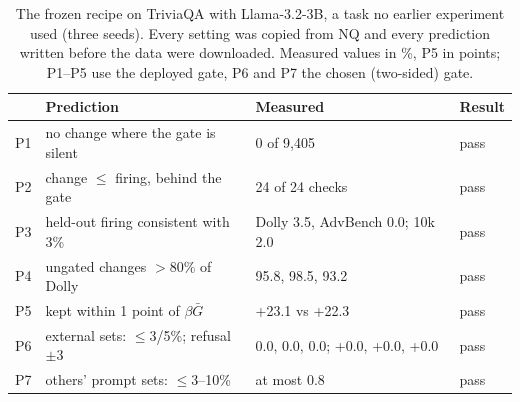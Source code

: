 \begin{table}[t]
\centering
\footnotesize
\setlength{\tabcolsep}{3pt}
\caption{The frozen recipe on TriviaQA with Llama-3.2-3B, a task no earlier experiment used (three seeds). Every
setting was copied from NQ and every prediction written before the data were downloaded. Measured values in \%,
P5 in points; P1--P5 use the deployed gate, P6 and P7 the chosen (two-sided) gate.}
\label{tab:trivia}
\begin{tabular}{l l l l}
\toprule
& Prediction & Measured & Result \\
\midrule
P1 & no change where the gate is silent & 0 of 9{,}405 & pass \\
P2 & change $\le$ firing, behind the gate & 24 of 24 checks & pass \\
P3 & held-out firing consistent with 3\% & Dolly 3.5, AdvBench 0.0; 10k 2.0 & pass \\
P4 & ungated changes $>80\%$ of Dolly & 95.8, 98.5, 93.2 & pass \\
P5 & kept within 1 point of $\beta\bar G$ & +23.1 vs +22.3 & pass \\
P6 & external sets: $\le$3/5\%; refusal $\pm$3 & 0.0, 0.0, 0.0; +0.0, +0.0, +0.0 & pass \\
P7 & others' prompt sets: $\le$3--10\% & at most 0.8 & pass \\
\bottomrule
\end{tabular}
\end{table}
